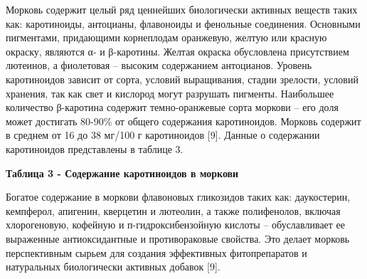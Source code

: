 Морковь содержит целый ряд ценнейших биологически активных веществ таких
как: каротиноиды, антоцианы, флавоноиды и фенольные соединения.
Основными пигментами, придающими корнеплодам оранжевую, желтую или
красную окраску, являются α- и β-каротины. Желтая окраска обусловлена
присутствием лютеинов, а фиолетовая -- высоким содержанием антоцианов.
Уровень каротиноидов зависит от сорта, условий выращивания, стадии
зрелости, условий хранения, так как свет и кислород могут разрушать
пигменты. Наибольшее количество β-каротина содержит темно-оранжевые
сорта моркови -- его доля может достигать 80-90\% от общего содержания
каротиноидов. Морковь содержит в среднем от 16 до 38 мг/100 г
каротиноидов {[}9{]}. Данные о содержании каротиноидов представлены в
таблице 3.

{\bfseries Таблица 3 - Содержание каротиноидов в моркови}


Богатое содержание в моркови флавоновых гликозидов таких как:
даукостерин, кемпферол, апигенин, кверцетин и лютеолин, а также
полифенолов, включая хлорогеновую, кофейную и п-гидроксибензойную
кислоты -- обуславливает ее выраженные антиоксидантные и противораковые
свойства. Это делает морковь перспективным сырьем для создания
эффективных фитопрепаратов и натуральных биологически активных добавок
{[}9{]}.

